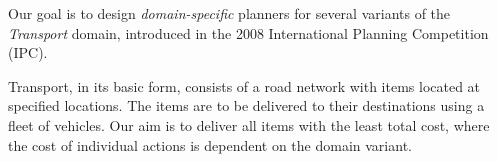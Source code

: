 \documentclass[a1paper,landscape,fontscale=0.45]{baposter} %
\begin{document}
\begin{poster}
{Our goal is to design \textit{domain-specific} planners 
for several variants of the \textit{Transport} domain, introduced in the 2008 International Planning Competition (IPC).

Transport, in its basic form, consists of a road network with items located at specified locations. The items are to be delivered to their destinations
using a fleet of vehicles. Our aim is to deliver all items
with the least total cost, where the cost of individual actions is dependent on the domain variant.
}







\end{poster}
\end{document}
